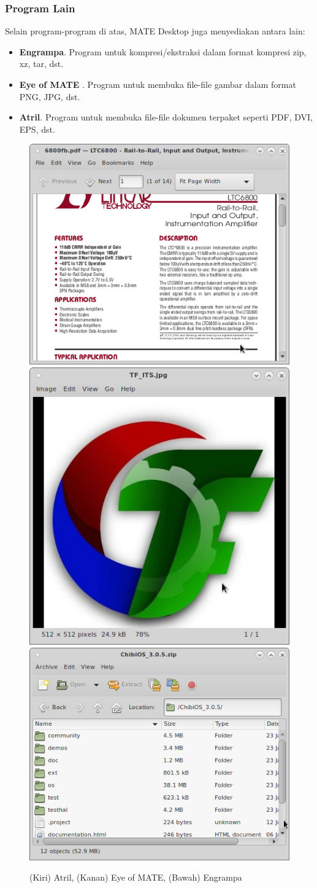 \documentclass[12pt,]{article}
\begin{document}
	\subsubsection{Program Lain}
	Selain program-program di atas, MATE Desktop juga menyediakan antara lain:
	\begin{itemize}
		\item \textbf{Engrampa}. Program untuk kompresi/ekstraksi dalam format kompresi zip, xz, tar, dst.
		\item \textbf{Eye of MATE} . Program untuk membuka file-file gambar dalam format PNG, JPG, dst.
		\item \textbf{Atril}. Program untuk membuka file-file dokumen terpaket seperti PDF, DVI, EPS, dst.
	\end{itemize} 

	\begin{figure}[H]
		\centering
		\includegraphics[width=0.45\linewidth]{images/mateapp/atril}
		\includegraphics[width=0.45\linewidth]{images/mateapp/eom}
		\includegraphics[width=0.45\linewidth]{images/mateapp/engrampa}
		\caption{(Kiri) Atril, (Kanan) Eye of MATE, (Bawah) Engrampa}
	\end{figure} 
\end{document}
